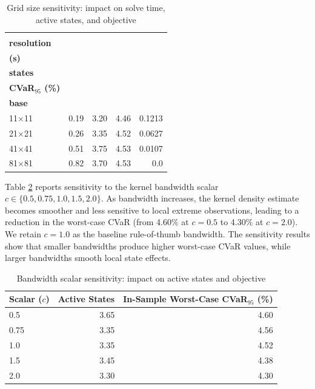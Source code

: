 \documentclass[smallcondensed]{svjour3}
\begin{document}
\begin{table}[!htbp]
\centering
\caption{Grid size sensitivity: impact on solve time, active states, and objective}
\label{tab:sens_grid}
\begin{tabular}{lrrrr}
\toprule
\makecell[l]{\textbf{Grid}\\\textbf{resolution}} & \makecell[r]{\textbf{Runtime}\\\textbf{(s)}} & \makecell[r]{\textbf{Active}\\\textbf{states}} & \makecell[r]{\textbf{Worst-case}\\\textbf{CVaR$_{95}$ (\%)}} & \makecell[r]{\textbf{Dist. to}\\\textbf{base}} \\
\midrule
11$\times$11 & 0.19 & 3.20 & 4.46 & 0.1213 \\
21$\times$21 & 0.26 & 3.35 & 4.52 & 0.0627 \\
41$\times$41 & 0.51 & 3.75 & 4.53 & 0.0107 \\
81$\times$81 & 0.82 & 3.70 & 4.53 & 0.0 \\
\bottomrule
\end{tabular}
\end{table}

Table \ref{tab:sens_bw} reports sensitivity to the kernel bandwidth scalar $c \in \{0.5, 0.75, 1.0, 1.5, 2.0\}$. As bandwidth increases, the kernel density estimate becomes smoother and less sensitive to local extreme observations, leading to a reduction in the worst-case CVaR (from 4.60\% at $c=0.5$ to 4.30\% at $c=2.0$). We retain $c=1.0$ as the baseline rule-of-thumb bandwidth. The sensitivity results show that smaller bandwidths produce higher worst-case CVaR values, while larger bandwidths smooth local state effects.

\begin{table}[!htbp]
\centering
\caption{Bandwidth scalar sensitivity: impact on active states and objective}
\label{tab:sens_bw}
\begin{tabular}{lrr}
\toprule
\textbf{Scalar ($c$)} & \textbf{Active States} & \textbf{In-Sample Worst-Case CVaR$_{95}$ (\%)} \\
\midrule
0.5 & 3.65 & 4.60 \\
0.75 & 3.35 & 4.56 \\
1.0 & 3.35 & 4.52 \\
1.5 & 3.45 & 4.38 \\
2.0 & 3.30 & 4.30 \\
\bottomrule
\end{tabular}
\end{table}
\end{document}
